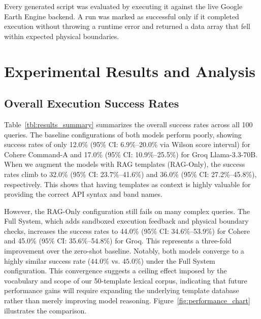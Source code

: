 \documentclass[pdflatex,sn-mathphys-ay]{sn-jnl}
\begin{document}
Every generated script was evaluated by executing it against the live Google Earth Engine backend. A run was marked as successful only if it completed execution without throwing a runtime error and returned a data array that fell within expected physical boundaries.

\section{Experimental Results and Analysis}\label{sec:results}

\subsection{Overall Execution Success Rates}\label{sec:res_overall}
Table~\ref{tbl:results_summary} summarizes the overall success rates across all 100 queries. The baseline configurations of both models perform poorly, showing success rates of only 12.0\% (95\% CI: 6.9\%--20.0\% via Wilson score interval) for Cohere Command-A and 17.0\% (95\% CI: 10.9\%--25.5\%) for Groq Llama-3.3-70B. When we augment the models with RAG templates (RAG-Only), the success rates climb to 32.0\% (95\% CI: 23.7\%--41.6\%) and 36.0\% (95\% CI: 27.2\%--45.8\%), respectively. This shows that having templates as context is highly valuable for providing the correct API syntax and band names.

However, the RAG-Only configuration still fails on many complex queries. The Full System, which adds sandboxed execution feedback and physical boundary checks, increases the success rates to 44.0\% (95\% CI: 34.6\%--53.9\%) for Cohere and 45.0\% (95\% CI: 35.6\%--54.8\%) for Groq. This represents a three-fold improvement over the zero-shot baseline. Notably, both models converge to a highly similar success rate ($44.0\%$ vs. $45.0\%$) under the Full System configuration. This convergence suggests a ceiling effect imposed by the vocabulary and scope of our 50-template lexical corpus, indicating that future performance gains will require expanding the underlying template database rather than merely improving model reasoning. Figure~\ref{fig:performance_chart} illustrates the comparison.
\end{document}
